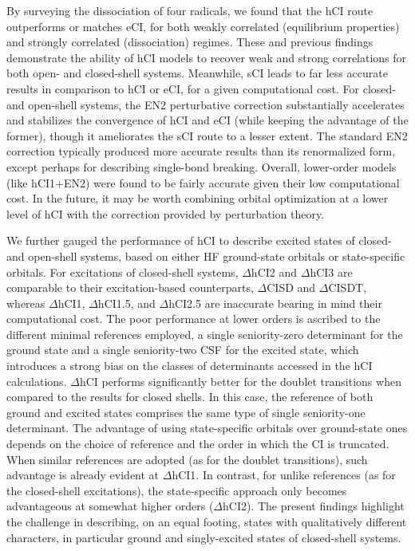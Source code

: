 \documentclass[aip,jcp,reprint,noshowkeys,superscriptaddress]{revtex4-1}
\begin{document}
By surveying the dissociation of four radicals,
we found that the hCI route outperforms or matches eCI, for both weakly correlated (equilibrium properties) and strongly correlated (dissociation) regimes.
These and previous \cite{Kossoski_2022} findings demonstrate the ability of hCI models to recover weak and strong correlations for both open- and closed-shell systems.
Meanwhile, sCI leads to far less accurate results in comparison to hCI or eCI, for a given computational cost.
For closed- and open-shell systems, the EN2 perturbative correction
substantially accelerates and stabilizes the convergence of hCI and eCI (while keeping the advantage of the former),
though it ameliorates the sCI route to a lesser extent.
The standard EN2 correction typically produced more accurate results than its renormalized form, except perhaps for describing single-bond breaking.
Overall, lower-order models (like hCI1+EN2) were found to be fairly accurate given their low computational cost.
In the future, it may be worth combining orbital optimization at a lower level of hCI \cite{Kossoski_2022} with the correction provided by perturbation theory.

We further gauged the performance of hCI to describe excited states of closed- and open-shell systems, based on either HF ground-state orbitals or state-specific orbitals.
For excitations of closed-shell systems, $\Delta$hCI2 and $\Delta$hCI3 are comparable to their excitation-based counterparts, $\Delta$CISD and $\Delta$CISDT,
whereas $\Delta$hCI1, $\Delta$hCI1.5, and $\Delta$hCI2.5 are inaccurate bearing in mind their computational cost.
The poor performance at lower orders is ascribed to the different minimal references employed,
a single seniority-zero determinant for the ground state and a single seniority-two CSF for the excited state,
which introduces a strong bias on the classes of determinants accessed in the hCI calculations.
$\Delta$hCI performs significantly better for the doublet transitions when compared to the results for closed shells.
In this case, the reference of both ground and excited states comprises the same type of single seniority-one determinant.
The advantage of using state-specific orbitals over ground-state ones depends on the choice of reference and the order in which the CI is truncated.
When similar references are adopted (as for the doublet transitions), such advantage is already evident at $\Delta$hCI1.
In contrast, for unlike references (as for the closed-shell excitations), the state-specific approach only becomes advantageous at somewhat higher orders ($\Delta$hCI2).
The present findings highlight the challenge in describing, on an equal footing, states with qualitatively different characters, in particular ground and singly-excited states of closed-shell systems.
\end{document}

